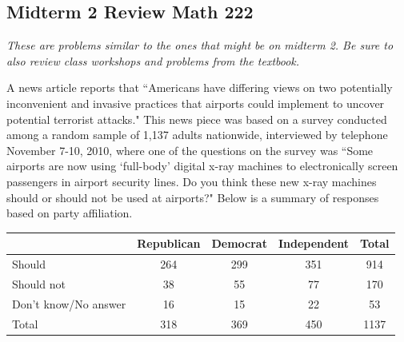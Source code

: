 \documentclass[11pt]{exam}
\begin{document}
\subsection*{Midterm 2 Review \hfill Math 222}

\textit{These are problems similar to the ones that might be on midterm 2. Be sure to also review class workshops and problems from the textbook.}

\begin{questions}


\question A news article reports that ``Americans have differing views
on two potentially inconvenient and invasive practices that airports could implement to uncover
potential terrorist attacks." This news piece was based on a survey conducted among a random
sample of 1{,}137 adults nationwide, interviewed by telephone November 7-10, 2010, where one of
the questions on the survey was ``Some airports are now using `full-body' digital x-ray machines to
electronically screen passengers in airport security lines. Do you think these new x-ray machines
should or should not be used at airports?" Below is a summary of responses based on party
affiliation.

\begin{center}
\begin{tabular}{l|ccc|c} 
~ & Republican & Democrat & Independent & Total \\ \hline
Should & 264 & 299 & 351 & 914 \\ 
Should not & 38 & 55 & 77 & 170 \\ 
Don't know/No answer & 16 & 15 & 22 & 53 \\  \hline
Total & 318 & 369 & 450 & 1137
\end{tabular}
\end{center}



\end{questions}
\end{document}

